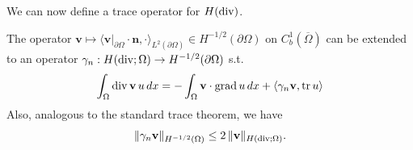\documentclass[../master_thesis.tex]{subfiles}
\begin{document}
We can now define a trace operator for $H(\operatorname{div})$.
\begin{theorem}\label{thm:trace_of_hdiv}
    The operator $\mathbf{v} \mapsto \langle \mathbf{v}|_{\partial \Omega} \cdot \mathbf{n}, \cdot
    \rangle_{L^2(\partial \Omega)} \in H^{-1/2}(\partial\Omega)$
    on $C^1_b(\overline{\Omega})$ can be extended to an operator 
    $\gamma_n: H(\operatorname{div};\Omega) \rightarrow H^{-1/2}(\partial \Omega)$ s.t.
    \begin{align*}
        \int_\Omega \operatorname{div} \mathbf{v} \,u \, dx 
        = -\int_\Omega \mathbf{v} \cdot \operatorname{grad} u \, dx + \langle \gamma_n \mathbf{v}, \operatorname{tr} u \rangle
    \end{align*}
    Also, analogous to the standard trace theorem, we have
    \begin{align*}
        \lVert \gamma_n \mathbf{v} \rVert _{H^{-1/2}(\Omega)} 
        \leq   2 \,  \lVert \mathbf{v}\rVert _{H(\operatorname{div}; \Omega)}.
    \end{align*}
\end{theorem}
\end{document}
